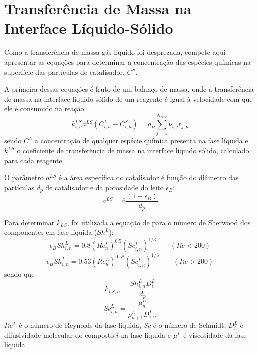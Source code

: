 \section{Transferência de Massa na Interface Líquido-Sólido}
\label{sec:interfaceliquidosolido}

Como a transferência de massa gás-líquido foi desprezada, compete aqui
apresentar as equações para determinar a concentração das espécies químicas
na superfície das partículas de catalisador, $C^S$. 

A primeira dessas equações é fruto de um balanço de massa, onde a
transferência de massa na interface líquido-sólido de um reagente é igual à
velocidade com que ele é consumido na reação:
\begin{equation}
k_{i,n}^{LS}a^{LS}(C^L_{i,n}-C^S_{i,n}) = \rho_B
\displaystyle\sum_{j=1}^{N_{reac}}
\nu_{i,j}r_{j,n}
\label{eq:transferenciamassa}
\end{equation}
sendo $C^{L}$ a concentração de qualquer espécie química presenta na fase
líquida e $k^{LS}$ o coeficiente de transferência de massa na interface líquido
sólido, calculado para cada reagente.


O parâmetro $a^{LS}$ é a área específica do catalisador é função do diâmetro
das partículas $d_p$ de catalisador e da porosidade do leito $\epsilon_B$:
\begin{equation}
a^{LS} = 6 \dfrac{(1-\epsilon_B)}{d_p}
\label{eq:aLS}
\end{equation}


Para determinar $k_{LS}$, foi utilizada a equação de 
para o número de Sherwood dos componentes em fase líquida ($Sh^L$):
\begin{equation}
\epsilon_BSh^L_{i,n} = \num{0,8}(Re^L_n)^{\num{0,5}}(Sc^L_{i,n})^{1/3} \qquad
(Re<200)
\label{eq:Sh1}
\end{equation}
\begin{equation}
\epsilon_BSh^L_{i,n} = \num{0,53}(Re^L_n)^{\num{0,58}}(Sc^L_{i,n})^{1/3} \qquad
(Re>200)
\label{eq:Sh2}
\end{equation}
sendo que
\begin{equation}
k_{LS,n} = \dfrac{Sh^L_{i,n}D^L_{i}}{d_p}
\label{eq:kLS}
\end{equation}
\begin{equation} 
Sc^L_{i,n} = \dfrac{\mu^L_{n}}{\rho^L_{n+1}D^L_{i,n}}
\label{eq:Sc}
\end{equation}
$Re^L$ é o número de Reynolds da fase líquida, $Sc$ é o número de Schmidt,
$D^L_{i}$ é difusividade molecular do composto $i$ na fase líquida e $\mu^L$ é
viscosidade da fase líquida.

